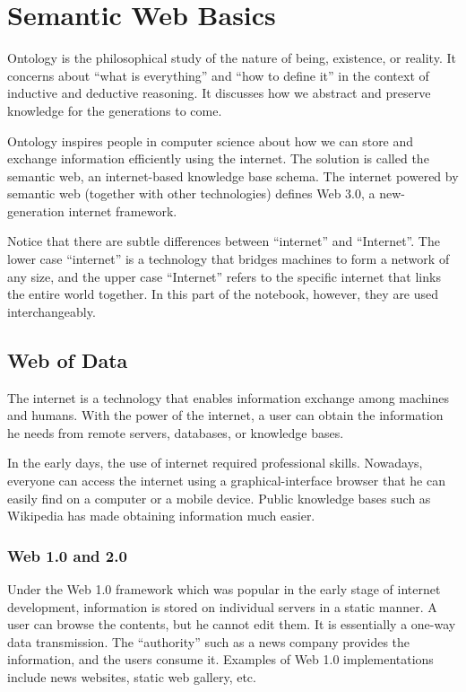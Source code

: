 \chapter{Semantic Web Basics} \label{ch:briefintrosemanticweb}

Ontology is the philosophical study of the nature of being, existence, or reality. It concerns about ``what is everything'' and ``how to define it'' in the context of inductive and deductive reasoning. It discusses how we abstract and preserve knowledge for the generations to come.

Ontology inspires people in computer science about how we can store and exchange information efficiently using the internet. The solution is called the semantic web, an internet-based knowledge base schema. The internet powered by semantic web (together with other technologies) defines Web 3.0, a new-generation internet framework.

Notice that there are subtle differences between ``internet'' and ``Internet''. The lower case ``internet'' is a technology that bridges machines to form a network of any size, and the upper case ``Internet'' refers to the specific internet that links the entire world together. In this part of the notebook, however, they are used interchangeably.  

\section{Web of Data}

The internet is a technology that enables information exchange among machines and humans. With the power of the internet, a user can obtain the information he needs from remote servers, databases, or knowledge bases.

In the early days, the use of internet required professional skills. Nowadays, everyone can access the internet using a graphical-interface browser that he can easily find on a computer or a mobile device. Public knowledge bases such as Wikipedia has made obtaining information much easier.

\subsection{Web 1.0 and 2.0}

Under the Web 1.0 framework which was popular in the early stage of internet development, information is stored on individual servers in a static manner. A user can browse the contents, but he cannot edit them. It is essentially a one-way data transmission. The ``authority'' such as a news company provides the information, and the users consume it. Examples of Web 1.0 implementations include news websites, static web gallery, etc.

